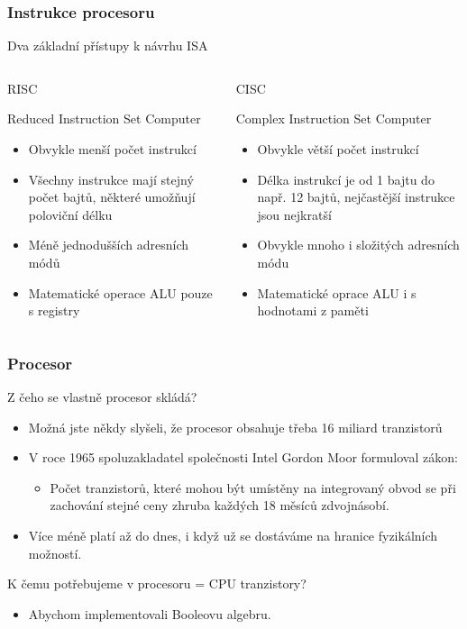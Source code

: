 \documentclass{beamer}
\begin{document}
\begin{frame}
\frametitle{Instrukce procesoru}

Dva základní přístupy k návrhu ISA
\begin{columns}
\begin{column}{0.5\textwidth}
\begin{center}
\LARGE{RISC}
\end{center}
Reduced Instruction Set Computer
\begin{itemize}
\item Obvykle menší počet instrukcí
\item Všechny instrukce mají stejný počet bajtů, některé umožňují poloviční délku
\item Méně jednodušších adresních módů
\item Matematické operace ALU pouze s registry
\end{itemize}
\end{column}
\begin{column}{0.5\textwidth}  
\begin{center}
\LARGE{CISC}
\end{center}
Complex Instruction Set Computer
\begin{itemize}
\item Obvykle větší počet instrukcí
\item Délka instrukcí je od 1 bajtu do např. 12 bajtů, nejčastější instrukce jsou nejkratší
\item Obvykle mnoho i složitých adresních módu
\item Matematické oprace ALU i s hodnotami z paměti
\end{itemize}

\end{column}
\end{columns}
\end{frame}


\begin{frame}
\frametitle{Procesor}

Z čeho se vlastně procesor skládá?
\begin{itemize}
\item Možná jste někdy slyšeli, že procesor obsahuje třeba 16 miliard tranzistorů
\item V roce 1965 spoluzakladatel společnosti Intel Gordon Moor formuloval zákon: 
\begin{itemize}
\item Počet tranzistorů, které mohou být umístěny na integrovaný obvod se při zachování stejné ceny zhruba každých 18 měsíců zdvojnásobí.
\end{itemize}
\item Více méně platí až do dnes, i když už se dostáváme na hranice fyzikálních možností.
\end{itemize}

K čemu potřebujeme v procesoru = CPU tranzistory?
\begin{itemize}
\item Abychom implementovali Booleovu algebru.
\end{itemize}
\end{frame}
\end{document}

